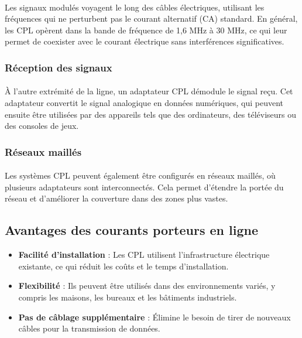 \documentclass[a4paper,draft,twocolumn]{report}
\begin{document}
\paragraph{} Les signaux modulés voyagent le long des câbles électriques, utilisant les fréquences qui ne perturbent pas le courant alternatif (CA) standard. En général, les CPL opèrent dans la bande de fréquence de 1,6 MHz à 30 MHz, ce qui leur permet de coexister avec le courant électrique sans interférences significatives.

\subsubsection{Réception des signaux}
\paragraph{} À l'autre extrémité de la ligne, un adaptateur CPL démodule le signal reçu. Cet adaptateur convertit le signal analogique en données numériques, qui peuvent ensuite être utilisées par des appareils tels que des ordinateurs, des téléviseurs ou des consoles de jeux.

\subsubsection{Réseaux maillés}
\paragraph{} Les systèmes CPL peuvent également être configurés en réseaux maillés, où plusieurs adaptateurs sont interconnectés. Cela permet d'étendre la portée du réseau et d'améliorer la couverture dans des zones plus vastes.

\subsection{Avantages des courants porteurs en ligne}
\begin{itemize}
    \item \textbf{Facilité d'installation} : Les CPL utilisent l'infrastructure électrique existante, ce qui réduit les coûts et le temps d'installation.
    \item \textbf{Flexibilité} : Ils peuvent être utilisés dans des environnements variés, y compris les maisons, les bureaux et les bâtiments industriels.
    \item \textbf{Pas de câblage supplémentaire} : Élimine le besoin de tirer de nouveaux câbles pour la transmission de données.
\end{itemize}
\end{document}
